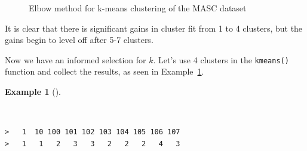 \documentclass[
  letterpaper,
]{latex/krantz}
\newenvironment{Shaded}{\begin{snugshade}}{\end{snugshade}}
\newcommand{\AttributeTok}[1]{\textcolor[rgb]{0.00,0.00,0.00}{#1}}
\newcommand{\CommentTok}[1]{\textcolor[rgb]{0.00,0.00,0.00}{\textit{#1}}}
\newcommand{\DecValTok}[1]{\textcolor[rgb]{0.00,0.00,0.00}{#1}}
\newcommand{\FunctionTok}[1]{\textcolor[rgb]{0.00,0.00,0.00}{#1}}
\newcommand{\NormalTok}[1]{\textcolor[rgb]{0.00,0.00,0.00}{#1}}
\newcommand{\OtherTok}[1]{\textcolor[rgb]{0.00,0.00,0.00}{#1}}
\newcommand{\SpecialCharTok}[1]{\textcolor[rgb]{0.00,0.00,0.00}{#1}}
\theoremstyle{definition}
\newtheorem{example}{Example}[chapter]
\theoremstyle{remark}
\begin{document}
\begin{figure}[H]


\caption{\label{fig-eda-masc-pos-kmeans-elbow}Elbow method for k-means
clustering of the MASC dataset}

\end{figure}%

It is clear that there is significant gains in cluster fit from 1 to 4
clusters, but the gains begin to level off after 5-7 clusters.

Now we have an informed selection for \(k\). Let's use 4 clusters in the
\texttt{kmeans()} function and collect the results, as seen in
Example~\ref{exm-eda-masc-pos-kmeans-fit}.

\begin{example}[]\protect\hypertarget{exm-eda-masc-pos-kmeans-fit}{}\label{exm-eda-masc-pos-kmeans-fit}

~

\begin{Shaded}
\end{Shaded}

\begin{verbatim}
>   1  10 100 101 102 103 104 105 106 107 
>   1   1   2   3   3   2   2   2   4   3
\end{verbatim}

\end{example}
\end{document}
